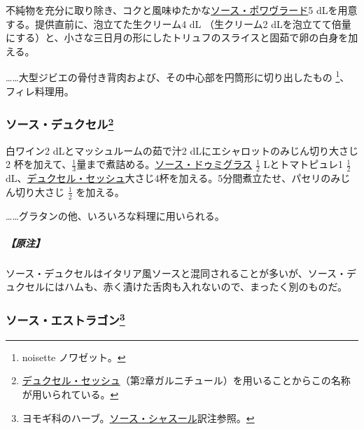 \begin{recette}

 

不純物を充分に取り除き、コクと風味ゆたかな\protect\hyperlink{sauce-poivrade}{ソース・ポワヴラード}5
dLを用意する。提供直前に、泡立てた生クリーム4 dL （生クリーム2
dLを泡立てて倍量にする）と、小さな三日月の形にしたトリュフのスライスと固茹で卵の白身を加える。

\ldots{}\ldots{}大型ジビエの骨付き背肉および、その中心部を円筒形に切り出したもの
\footnote{noisette ノワゼット。}、フィレ料理用。

\hypertarget{sauce-duxelles}{%
\subsubsection[ソース・デュクセル]{\texorpdfstring{ソース・デュクセル\footnote{\protect\hyperlink{duxelles-seche}{デュクセル・セッシュ}（第2章ガルニチュール）を用いることからこの名称が用いられている。}}{ソース・デュクセル}}\label{sauce-duxelles}}



白ワイン2 dLとマッシュルームの茹で汁2
dLにエシャロットのみじん切り大さじ2
杯を加えて、\(\frac{1}{3}\)量まで煮詰める。\protect\hyperlink{sauce-demi-glace}{ソース・ドゥミグラス}
\(\frac{1}{2}\) Lとトマトピュレ1 \(\frac{1}{2}\)
dL、\protect\hyperlink{duxelles-seche}{デュクセル・セッシュ}大さじ4杯を加える。5分間煮立たせ、パセリのみじん切り大さじ
\(\frac{1}{2}\) を加える。

\ldots{}\ldots{}グラタンの他、いろいろな料理に用いられる。

\hypertarget{nota-sauce-duxelles}{%
\subparagraph{【原注】}\label{nota-sauce-duxelles}}

ソース・デュクセルはイタリア風ソースと混同されることが多いが、ソース・デュクセルにはハムも、赤く漬けた舌肉も入れないので、まったく別のものだ。

\hypertarget{sauce-estragon}{%
\subsubsection[ソース・エストラゴン]{\texorpdfstring{ソース・エストラゴン\footnote{ヨモギ科のハーブ。\protect\hyperlink{sauce-chasseur}{ソース・シャスール}訳注参照。}}{ソース・エストラゴン}}\label{sauce-estragon}}


\end{recette}

